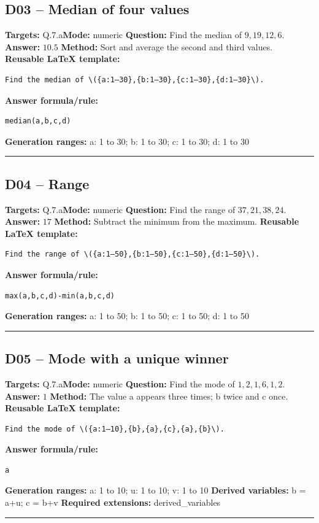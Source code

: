 \documentclass[11pt]{article}
\begin{document}
\subsection{D03 -- Median of four values}
\textbf{Targets:} Q.7.a\quad\textbf{Mode:} numeric
\textbf{Question:} Find the median of \(9,19,12,6\).
\textbf{Answer:} \(10.5\)
\textbf{Method:} Sort and average the second and third values.
\textbf{Reusable LaTeX template:}
\begin{verbatim}
Find the median of \({a:1–30},{b:1–30},{c:1–30},{d:1–30}\).
\end{verbatim}
\textbf{Answer formula/rule:}
\begin{verbatim}
median(a,b,c,d)
\end{verbatim}
\textbf{Generation ranges:} a: 1 to 30; b: 1 to 30; c: 1 to 30; d: 1 to 30
\medskip\hrule\medskip
\subsection{D04 -- Range}
\textbf{Targets:} Q.7.a\quad\textbf{Mode:} numeric
\textbf{Question:} Find the range of \(37,21,38,24\).
\textbf{Answer:} \(17\)
\textbf{Method:} Subtract the minimum from the maximum.
\textbf{Reusable LaTeX template:}
\begin{verbatim}
Find the range of \({a:1–50},{b:1–50},{c:1–50},{d:1–50}\).
\end{verbatim}
\textbf{Answer formula/rule:}
\begin{verbatim}
max(a,b,c,d)-min(a,b,c,d)
\end{verbatim}
\textbf{Generation ranges:} a: 1 to 50; b: 1 to 50; c: 1 to 50; d: 1 to 50
\medskip\hrule\medskip
\subsection{D05 -- Mode with a unique winner}
\textbf{Targets:} Q.7.a\quad\textbf{Mode:} numeric
\textbf{Question:} Find the mode of \(1,2,1,6,1,2\).
\textbf{Answer:} \(1\)
\textbf{Method:} The value a appears three times; b twice and c once.
\textbf{Reusable LaTeX template:}
\begin{verbatim}
Find the mode of \({a:1–10},{b},{a},{c},{a},{b}\).
\end{verbatim}
\textbf{Answer formula/rule:}
\begin{verbatim}
a
\end{verbatim}
\textbf{Generation ranges:} a: 1 to 10; u: 1 to 10; v: 1 to 10
\textbf{Derived variables:} b = a+u; c = b+v
\textbf{Required extensions:} derived\_variables
\medskip\hrule\medskip
\end{document}

